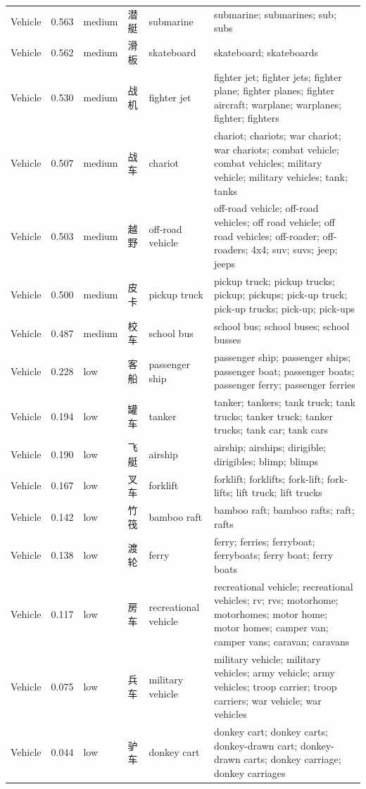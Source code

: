 {\begin{longtable}[c]{@{}>{\raggedright\arraybackslash}p{1.85cm}l l l>{\raggedright\arraybackslash}p{1.85cm}>{\raggedright\arraybackslash}p{8.10cm}@{}}
Vehicle & 0.563 & medium & 潜艇 & submarine & submarine; submarines; sub; subs \\
Vehicle & 0.562 & medium & 滑板 & skateboard & skateboard; skateboards \\
Vehicle & 0.530 & medium & 战机 & fighter jet & fighter jet; fighter jets; fighter plane; fighter planes; fighter aircraft; warplane; warplanes; fighter; fighters \\
Vehicle & 0.507 & medium & 战车 & chariot & chariot; chariots; war chariot; war chariots; combat vehicle; combat vehicles; military vehicle; military vehicles; tank; tanks \\
Vehicle & 0.503 & medium & 越野 & off-road vehicle & off-road vehicle; off-road vehicles; off road vehicle; off road vehicles; off-roader; off-roaders; 4x4; suv; suvs; jeep; jeeps \\
Vehicle & 0.500 & medium & 皮卡 & pickup truck & pickup truck; pickup trucks; pickup; pickups; pick-up truck; pick-up trucks; pick-up; pick-ups \\
Vehicle & 0.487 & medium & 校车 & school bus & school bus; school buses; school busses \\
Vehicle & 0.228 & low & 客船 & passenger ship & passenger ship; passenger ships; passenger boat; passenger boats; passenger ferry; passenger ferries \\
Vehicle & 0.194 & low & 罐车 & tanker & tanker; tankers; tank truck; tank trucks; tanker truck; tanker trucks; tank car; tank cars \\
Vehicle & 0.190 & low & 飞艇 & airship & airship; airships; dirigible; dirigibles; blimp; blimps \\
Vehicle & 0.167 & low & 叉车 & forklift & forklift; forklifts; fork-lift; fork-lifts; lift truck; lift trucks \\
Vehicle & 0.142 & low & 竹筏 & bamboo raft & bamboo raft; bamboo rafts; raft; rafts \\
Vehicle & 0.138 & low & 渡轮 & ferry & ferry; ferries; ferryboat; ferryboats; ferry boat; ferry boats \\
Vehicle & 0.117 & low & 房车 & recreational vehicle & recreational vehicle; recreational vehicles; rv; rvs; motorhome; motorhomes; motor home; motor homes; camper van; camper vans; caravan; caravans \\
Vehicle & 0.075 & low & 兵车 & military vehicle & military vehicle; military vehicles; army vehicle; army vehicles; troop carrier; troop carriers; war vehicle; war vehicles \\
Vehicle & 0.044 & low & 驴车 & donkey cart & donkey cart; donkey carts; donkey-drawn cart; donkey-drawn carts; donkey carriage; donkey carriages \\

\end{longtable}}
